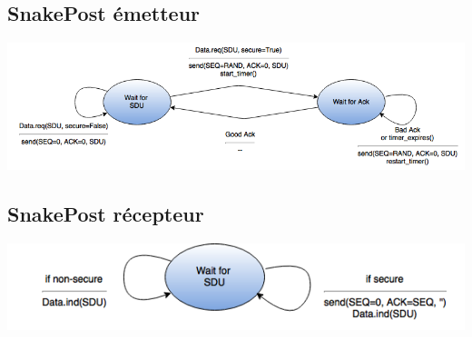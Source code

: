 \documentclass[a4paper]{article}
\begin{document}
\subsection{SnakePost émetteur}
\begin{center}
\includegraphics[scale=0.6]{sp_emetteur.png}
\end{center}
\subsection{SnakePost récepteur}
\begin{center}
\includegraphics[scale=0.7]{sp_recepteur.png}
\end{center}
\end{document}
